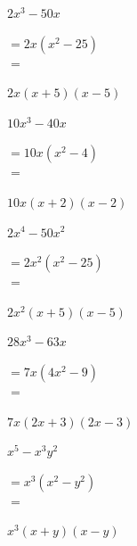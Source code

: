 \begin{tasks}
    \task \begin{exercise}$2x^3-50x$
              \begin{envSolution}
                 $ =2x(x^2-25)   $\\
                 $ =$			 
                     \begin{shortsolution}
  	                    $ 2x(x+5)(x-5)$
                     \end{shortsolution}
              \end{envSolution}%
          \end{exercise}
 
    \task \begin{exercise}$10x^3-40x$
              \begin{envSolution}
                 $ =10x(x^2-4)   $\\
                 $ = $				 
                     \begin{shortsolution}
  	                    $ 10x(x+2)(x-2)$
                     \end{shortsolution}
              \end{envSolution}%
          \end{exercise}
 
    \task \begin{exercise}$2x^4-50x^2$
              \begin{envSolution}
                 $ =2x^2(x^2-25)   $\\
                 $ = $				 
                     \begin{shortsolution}
  	                    $ 2x^2(x+5)(x-5)$
                     \end{shortsolution}
              \end{envSolution}%
          \end{exercise}

    \task \begin{exercise}$28x^3-63x$
              \begin{envSolution}
                 $ =7x(4x^2-9)   $\\
                 $ = $				 
                     \begin{shortsolution}
  	                    $ 7x(2x+3)(2x-3)$
                     \end{shortsolution}
              \end{envSolution}%
          \end{exercise}

    \task \begin{exercise}$x^5-x^3 y^2$
              \begin{envSolution}
                 $ =x^3(x^2-y^2)   $\\
                 $ = $				 
                     \begin{shortsolution}
  	                    $ x^3(x+y)(x-y)$
                     \end{shortsolution}
              \end{envSolution}%
          \end{exercise}


\end{tasks}
